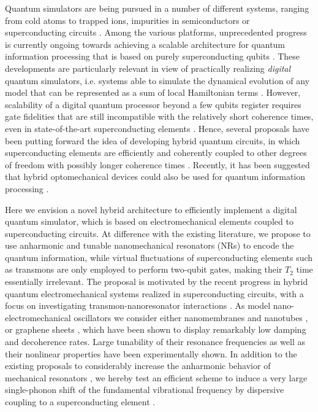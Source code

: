 \documentclass[aps,twocolumn,groupedaddress,superscriptaddress,floatfix,amsmath,amssymb,prb]{revtex4-1}
\begin{document}
{Quantum simulators are being pursued in a number of different systems, ranging from cold atoms to  trapped ions, impurities in semiconductors or superconducting circuits \cite{Georgescu2014}. Among the various platforms, unprecedented progress is currently ongoing towards achieving a scalable architecture for quantum information processing that is based on purely superconducting qubits \cite{Clarke2008,Mariantoni2011,Devoret2013,Gambetta2017}.
These developments are particularly relevant in view of practically realizing \textit{digital} quantum simulators, i.e. systems able to simulate the dynamical evolution of any model that can be represented as a sum of local Hamiltonian terms \cite{Lloyd1996}. 
However,  scalability of a digital quantum processor beyond a few qubits register requires gate fidelities that are still incompatible with the relatively short coherence times, even in state-of-the-art superconducting elements \cite{Koch2007,Rigetti2012}. Hence, several proposals have been putting forward the idea of developing hybrid quantum circuits, in which superconducting elements are efficiently and coherently coupled to other degrees of freedom with possibly longer coherence times \cite{Xiang2013,Carretta2013,Chiesa2014}. Recently, it has been suggested that hybrid optomechanical devices could also be used for quantum information processing \cite{Rips2013}. 

Here we envision a novel hybrid architecture to efficiently implement a digital quantum simulator, which is based on electromechanical elements coupled to superconducting circuits. At difference with the existing literature, we propose to use anharmonic and tunable nanomechanical resonators (NRs) to encode the quantum information, while virtual fluctuations of superconducting elements such as transmons are only employed to perform two-qubit gates, making their $T_2$ time essentially irrelevant. The proposal is motivated by the recent progress in hybrid quantum electromechanical systems realized in superconducting circuits, with a focus on investigating transmon-nanoresonator interactions \cite{Lahaye2009,OConnel2010,Sillanpaa2013,Sillanpaa2015,Rouxinol2016,Chu2017}. As model nano-electromechanical oscillators we consider either nanomembranes \cite{Teufel2011,Palomaki2013} and nanotubes \cite{Schneider2014,Moser2014}, or graphene sheets \cite{Singh2014,Weber2014,Song2014}, which have been shown to display remarkably low damping and decoherence rates. Large tunability of their resonance frequencies \cite{Singh2014,Weber2014,Postma2005,Kozinsky2006} as well as their nonlinear properties \cite{Kozinsky2006,Agarwal2006} have been experimentally shown. In addition to the existing proposals to considerably increase the anharmonic behavior of mechanical resonators \cite{Khan2013,Rips2014}, we hereby test an efficient scheme to induce a very large single-phonon shift of the fundamental vibrational frequency by dispersive coupling to a superconducting element \cite{Nori2010}. 

}
\end{document}
